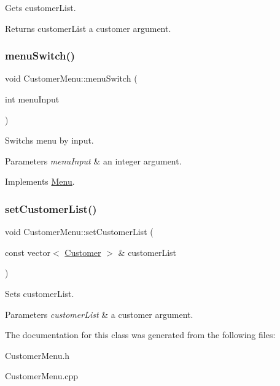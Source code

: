 Gets customer\+List. 

\begin{DoxyReturn}{Returns}
customer\+List a customer argument. 
\end{DoxyReturn}
\mbox{\label{classCustomerMenu_a9c43057a2fdd5fa1323e4cc1ec54f4be}} 
\subsubsection{\texorpdfstring{menu\+Switch()}{menuSwitch()}}
{\footnotesize\ttfamily void Customer\+Menu\+::menu\+Switch (\begin{DoxyParamCaption}\item[{int}]{menu\+Input }\end{DoxyParamCaption})\hspace{0.3cm}{\ttfamily [virtual]}}



Switchs menu by input. 


\begin{DoxyParams}{Parameters}
{\em menu\+Input} & an integer argument. \\
\hline
\end{DoxyParams}


Implements \hyperlink{classMenu_ae9d7af36b1a380e5e4b03ddbef9ceeca}{Menu}.

\mbox{\label{classCustomerMenu_abd785329cc569b15848388dd9e193613}} 
\subsubsection{\texorpdfstring{set\+Customer\+List()}{setCustomerList()}}
{\footnotesize\ttfamily void Customer\+Menu\+::set\+Customer\+List (\begin{DoxyParamCaption}\item[{const vector$<$ \hyperlink{classCustomer}{Customer} $>$ \&}]{customer\+List }\end{DoxyParamCaption})}



Sets customer\+List. 


\begin{DoxyParams}{Parameters}
{\em customer\+List} & a customer argument. \\
\hline
\end{DoxyParams}


The documentation for this class was generated from the following files\+:\begin{DoxyCompactItemize}
\item 
Customer\+Menu.\+h\item 
Customer\+Menu.\+cpp\end{DoxyCompactItemize}
